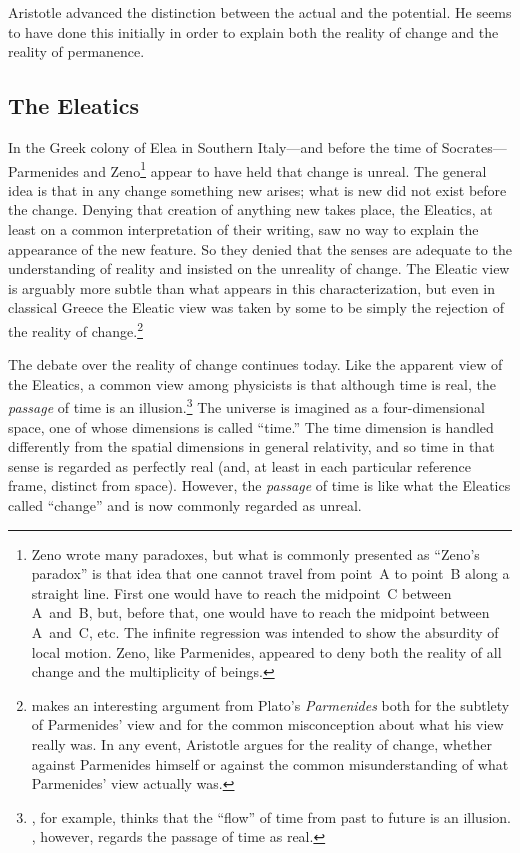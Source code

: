 \documentclass[twocolumn]{article}
\begin{document}
Aristotle advanced the distinction between the actual and the potential.  He
seems to have done this initially in order to explain both the reality of
change and the reality of permanence.

\subsection{The Eleatics}

In the Greek colony of Elea in Southern Italy---and before the time of
Socrates---Parmenides and Zeno\footnote{%
   Zeno wrote many paradoxes, but what is commonly presented as ``Zeno's
   paradox'' is that idea that one cannot travel from point~A to point~B along
   a straight line.  First one would have to reach the midpoint~C between
   A~and~B, but, before that, one would have to reach the midpoint between
   A~and~C, etc.  The infinite regression was intended to show the absurdity of
   local motion.  Zeno, like Parmenides, appeared to deny both the reality of
   all change and the multiplicity of beings.%
}
appear to have held that change is unreal.  The general idea is that in any
change something new arises; what is new did not exist before the change.
Denying that creation of anything new takes place, the Eleatics, at least on a
common interpretation of their writing, saw no way to explain the appearance of
the new feature.  So they denied that the senses are adequate to the
understanding of reality and insisted on the unreality of change.  The Eleatic
view is arguably more subtle than what appears in this characterization, but
even in classical Greece the Eleatic view was taken by some to be simply the
rejection of the reality of change.\footnote{%
   \cite{p2017} makes an interesting argument from Plato's {\it Parmenides}
   both for the subtlety of Parmenides' view and for the common misconception
   about what his view really was.  In any event, Aristotle argues for the
   reality of change, whether against Parmenides himself or against the common
   misunderstanding of what Parmenides' view actually was.%
}

The debate over the reality of change continues today.  Like the apparent view
of the Eleatics, a common view among physicists is that although time is real,
the \emph{passage} of time is an illusion.\footnote{%
   \cite{c2015}, for example, thinks that the ``flow'' of time from past to
   future is an illusion. \cite{s2013}, however, regards the passage of time as
   real.%
}
The universe is imagined as a four-dimensional space, one of whose dimensions
is called ``time.''  The time dimension is handled differently from the spatial
dimensions in general relativity, and so time in that sense is regarded as
perfectly real (and, at least in each particular reference frame, distinct from
space).  However, the \emph{passage} of time is like what the Eleatics called
``change'' and is now commonly regarded as unreal.
\end{document}
